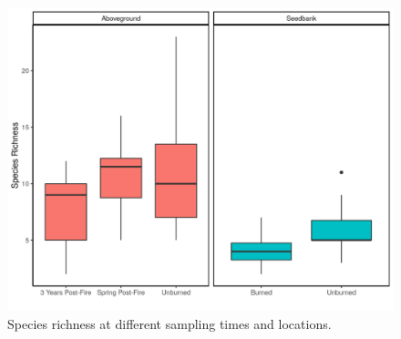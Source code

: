 \documentclass[
  11pt,
]{article}
\begin{document}
\newpage

\begin{figure}
\centering
\includegraphics{images/richness_fig.png}
\caption{Species richness at different sampling times and locations.}
\end{figure}
\end{document}
